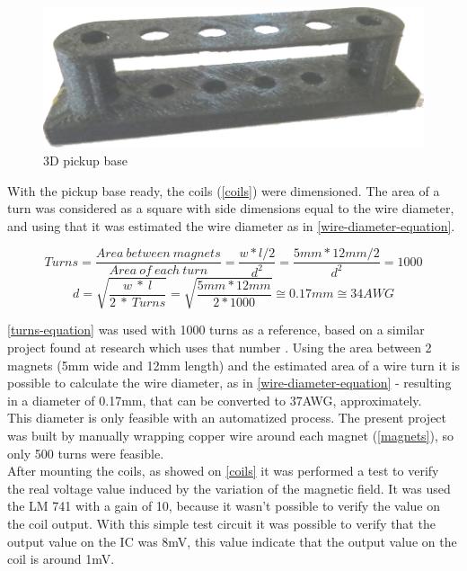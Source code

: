 \begin{figure}[!htpb]
\centering
\caption{3D pickup base}
\label{3D-base}
\includegraphics[scale=0.08]{images/base}
\end{figure}

With the pickup base ready, the coils (\autoref{coils}) were dimensioned. The area of a turn
was considered as a square with side dimensions equal to the wire diameter, and using that
it was estimated the wire diameter as in \autoref{wire-diameter-equation}.

\begin{equation}
  \label{turns-equation}
  Turns = \frac{Area\ between\ magnets}{Area\ of\ each\ turn} = \frac{ w * l / 2 }{ d^{2} } = \frac{5mm * 12mm / 2}{d^2} = 1000
\end{equation}
\begin{equation}
  \label{wire-diameter-equation}
  d = \sqrt{\frac{w\ *\ l}{2\ *\ Turns}} = \sqrt{\frac{5mm * 12mm}{2*1000}} \cong 0.17mm \cong 34AWG
\end{equation}

\autoref{turns-equation} was used with 1000 turns as a reference, based on a similar project found
at research which uses that number \cite{hexaphonic-pickup}. Using the area between 2 magnets (5mm wide
and 12mm length) and the estimated area of a wire turn it is possible to calculate the wire diameter,
as in \autoref{wire-diameter-equation} - resulting in a diameter of 0.17mm, that can be
converted to 37AWG, approximately. \\
This diameter is only feasible with an automatized process. The present project was built by manually
wrapping copper wire around each magnet (\autoref{magnets}), so only 500 turns were feasible. \\
After mounting the coils, as showed on \autoref{coils} it was performed a test to verify the real voltage value induced by
the variation of the magnetic field. It was used the LM 741 \cite{LM741} with a gain of 10,
because it wasn't possible to verify the value on the coil output. With this simple test circuit
it was possible to verify that the output value on the IC was 8mV, this value indicate that the
output value on the coil is around 1mV.

